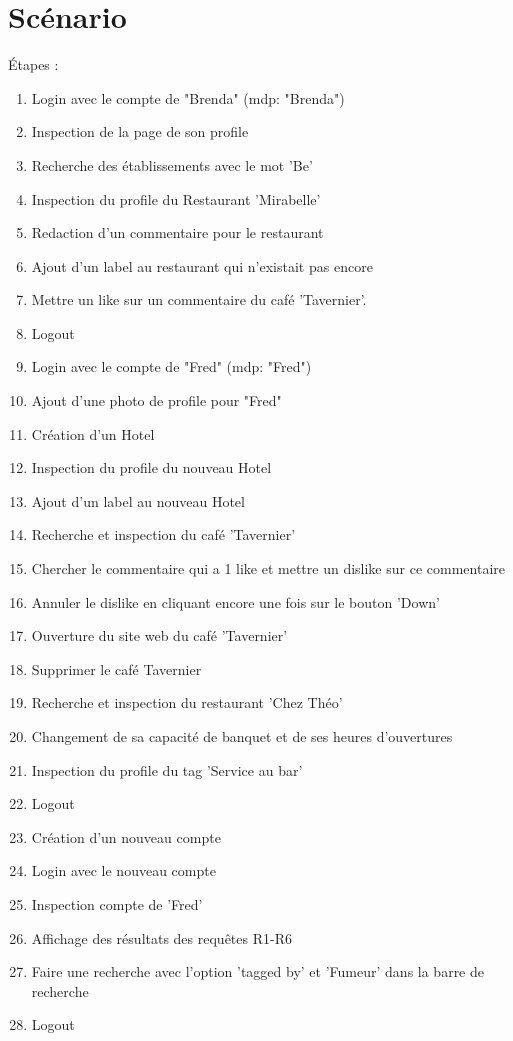 \documentclass[11pt,a4paper]{report}
\begin{document}
\section*{Scénario}
Étapes :
\begin{enumerate}
\item Login avec le compte de "Brenda" (mdp: "Brenda")
\item Inspection de la page de son profile
\item Recherche des établissements avec le mot 'Be'
\item Inspection du profile du Restaurant 'Mirabelle'
\item Redaction d'un commentaire pour le restaurant
\item Ajout d'un label au restaurant qui n'existait pas encore
\item Mettre un like sur un commentaire du café 'Tavernier'.
\item Logout
\item Login avec le compte de "Fred" (mdp: "Fred")
\item Ajout d'une photo de profile pour "Fred"
\item Création d'un Hotel
\item Inspection du profile du nouveau Hotel
\item Ajout d'un label au nouveau Hotel
\item Recherche et inspection du café 'Tavernier'
\item Chercher le commentaire qui a 1 like et mettre un dislike sur ce commentaire
\item Annuler le dislike en cliquant encore une fois sur le bouton 'Down'
\item Ouverture du site web du café 'Tavernier'
\item Supprimer le café Tavernier
\item Recherche et inspection du restaurant 'Chez Théo'
\item Changement de sa capacité de banquet et de ses heures d'ouvertures
\item Inspection du profile du tag 'Service au bar'
\item Logout
\item Création d'un nouveau compte
\item Login avec le nouveau compte
\item Inspection compte de 'Fred' 
\item Affichage des résultats des requêtes R1-R6
\item Faire une recherche avec l'option 'tagged by' et 'Fumeur' dans la barre de recherche
\item Logout
\end{enumerate}
\end{document}
